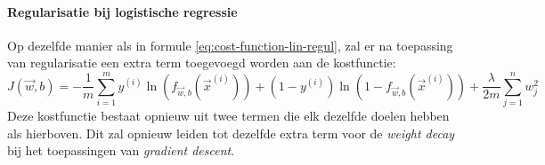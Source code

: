 \paragraph{Regularisatie bij logistische regressie}

Op dezelfde manier als in formule \ref{eq:cost-function-lin-regul}, zal er na toepassing van regularisatie een extra term toegevoegd worden aan de kostfunctie:
\begin{equation}
	J(\vec{w}, b) = -\frac{1}{m} \sum_{i=1}^{m} y^{(i)}\ln(f_{\vec{w},b}(\vec{x}^{(i)})) + (1 - y^{(i)}) \ln(1 - f_{\vec{w},b}(\vec{x}^{(i)})) + \frac{\lambda}{2m} \sum_{j=1}^{n} w_{j}^{2}
\end{equation}
\noindent
Deze kostfunctie bestaat opnieuw uit twee termen die elk dezelfde doelen hebben als hierboven. Dit zal opnieuw leiden tot dezelfde extra term voor de \textit{weight decay} bij het toepassingen van \textit{gradient descent}.